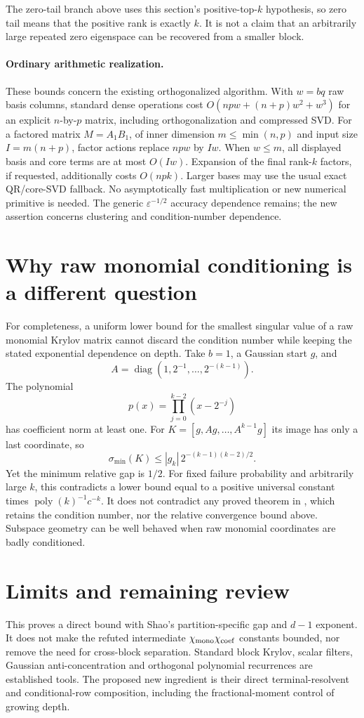 \documentclass[11pt]{article}
\begin{document}
The zero-tail branch above uses this section's positive-top-$k$
hypothesis, so zero tail means that the positive rank is exactly $k$.
It is not a claim that an arbitrarily large repeated zero eigenspace can
be recovered from a smaller block.

\paragraph{Ordinary arithmetic realization.}
These bounds concern the existing orthogonalized algorithm. With
$w=bq$ raw basis columns, standard dense operations cost
$O(npw+(n+p)w^2+w^3)$ for an explicit $n$-by-$p$ matrix, including
orthogonalization and compressed SVD. For a factored matrix
$M=A_1B_1$, of inner dimension $m\leq\min(n,p)$ and input size
$I=m(n+p)$, factor actions replace $npw$ by $Iw$.
When $w\leq m$, all displayed basis and core terms are at most $O(Iw)$.
Expansion of the final rank-$k$ factors, if requested, additionally costs
$O(npk)$. Larger bases may use the usual exact QR/core-SVD fallback.
No asymptotically fast multiplication or new numerical primitive is
needed. The generic $\varepsilon^{-1/2}$ accuracy dependence remains;
the new assertion concerns clustering and condition-number dependence.

\section{Why raw monomial conditioning is a different question}
For completeness, a uniform lower bound for the smallest singular value
of a raw monomial Krylov matrix cannot discard the condition number
while keeping the stated exponential dependence on depth. Take $b=1$,
a Gaussian start $g$, and
\[
 A=\operatorname{diag}(1,2^{-1},\ldots,2^{-(k-1)}).
\]
The polynomial
\[
 p(x)=\prod_{j=0}^{k-2}(x-2^{-j})
\]
has coefficient norm at least one. For
$K=[g,Ag,\ldots,A^{k-1}g]$ its image has only a last coordinate, so
\[
 \sigma_{\min}(K)\leq|g_k|\,2^{-(k-1)(k-2)/2}.
\]
Yet the minimum relative gap is $1/2$. For fixed failure probability and
arbitrarily large $k$, this contradicts a lower bound equal to a positive
universal constant times $\operatorname{poly}(k)^{-1}c^{-k}$.
It does not contradict any proved theorem in \cite{chen}, which retains
the condition number, nor the relative convergence bound above.
Subspace geometry can be well behaved when raw monomial coordinates
are badly conditioned.

\section{Limits and remaining review}
This proves a direct bound with Shao's partition-specific gap and
$d-1$ exponent. It does not make the refuted intermediate
$\chi_{\rm mono}\chi_{\rm coef}$ constants bounded, nor remove the need
for cross-block separation. Standard block Krylov, scalar filters,
Gaussian anti-concentration and orthogonal polynomial recurrences are
established tools. The proposed new ingredient is their direct
terminal-resolvent and conditional-row composition, including the
fractional-moment control of growing depth.
\end{document}
